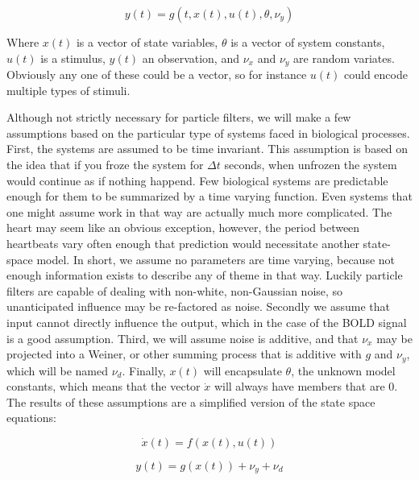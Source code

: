 \begin{equation}
y(t) = g(t, x(t), u(t), \theta, \nu_y)
\end{equation}

Where $x(t)$ is a vector of state variables, $\theta$ is a vector of system
constants, $u(t)$ is a stimulus, $y(t)$ an observation, and
$\nu_x$ and $\nu_y$ are random variates. Obviously any one of these could
be a vector, so for instance $u(t)$ could encode multiple types of stimuli.

Although not strictly necessary for particle filters, we will make a few
assumptions based on the particular type of systems faced in biological 
processes. First, the systems are assumed to be time invariant. This 
assumption is based on the idea that if you froze the system for $\Delta t$
seconds, when unfrozen the system would continue as if nothing happend. 
Few biological systems are predictable enough for them to be summarized
by a time varying function. Even systems that one might assume work in that
way are actually much more complicated. The heart may seem like an obvious
exception, however, the period between heartbeats vary often enough that prediction
would necessitate another state-space model. In short, we
assume no parameters are time varying, because not enough information exists to
describe any of theme in that way. Luckily particle filters are capable 
of dealing with non-white, non-Gaussian noise, so unanticipated influence
may be re-factored as noise. Secondly we assume that input cannot directly
influence the output, which in the case of the BOLD signal is a good assumption.
Third, we will assume noise is additive, and that $\nu_x$ may be projected into
a Weiner, or other summing process that is additive with $g$ and $\nu_y$, which
will be named $\nu_d$.
Finally, $x(t)$ will encapsulate $\theta$, the unknown model constants, which
means that the vector $\dot{x}$ will always have members
that are 0. The results of these assumptions are a simplified version of the
state space equations:

\begin{equation}
\dot{x}(t) = f(x(t), u(t))
\label{eq:stateass}
\end{equation}

\begin{equation}
y(t) = g(x(t)) + \nu_y + \nu_d
\label{eq:measass}
\end{equation}

